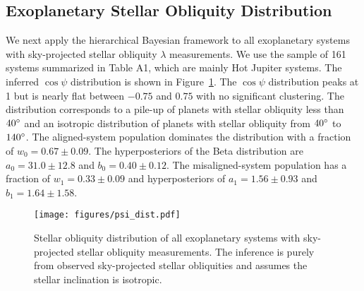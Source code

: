 \documentclass[twocolumn,times]{aastex631}
\begin{document}

\subsection{Exoplanetary Stellar Obliquity Distribution}

We next apply the hierarchical Bayesian framework to all exoplanetary systems with sky-projected stellar obliquity $\lambda$ measurements. We use the sample of 161 systems summarized in \cite{Albrecht22} Table A1, which are mainly Hot Jupiter systems. The inferred $\cos{\psi}$ distribution is shown in Figure~\ref{fig:psi_dist}. The $\cos{\psi}$ distribution peaks at 1 but is nearly flat between $-0.75$ and $0.75$ with no significant clustering. The distribution corresponds to a pile-up of planets with stellar obliquity less than $40\mbox{$^\circ$}$ and an isotropic distribution of planets with stellar obliquity from $40\mbox{$^\circ$}$ to $140\mbox{$^\circ$}$. 
The aligned-system population dominates the distribution with a fraction of $w_0 = 0.67 \pm 0.09$. The hyperposteriors of the Beta distribution are $a_0 = 31.0\pm12.8$ and $b_0 = 0.40\pm0.12$.
The misaligned-system population has a fraction of $w_1 = 0.33 \pm 0.09$ and hyperposteriors of $a_1 = 1.56\pm0.93$ and $b_1 = 1.64\pm1.58$.

\begin{figure}[ht!]
    \begin{centering}
        \texttt{[image: figures/psi\_dist.pdf]}
        \caption{Stellar obliquity distribution of all exoplanetary systems with sky-projected stellar obliquity measurements. The inference is purely from observed sky-projected stellar obliquities and assumes the stellar inclination is isotropic.}
        \label{fig:psi_dist}
    \end{centering}
\end{figure}
\end{document}
